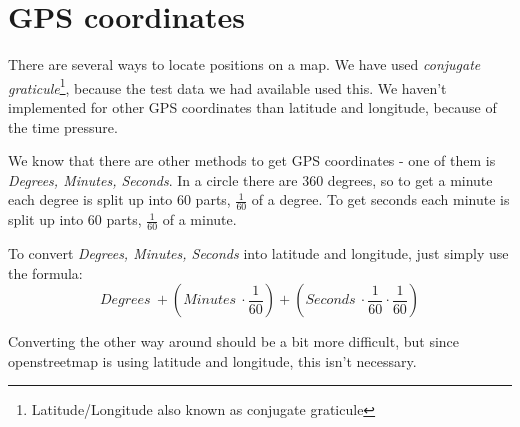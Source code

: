 \chapter{GPS coordinates}
There are several ways to locate positions on a map. We have used \emph{conjugate graticule}\footnote{Latitude/Longitude also known as conjugate graticule}, because the test data we had available used this. We haven't implemented for other GPS coordinates than latitude and longitude, because of the time pressure.

We know that there are other methods to get GPS coordinates - one of them is \emph{Degrees, Minutes, Seconds}. In a circle there are 360 degrees, so to get a minute each degree is split up into 60 parts, $\frac{1}{60}$ of a degree. To get seconds each minute is split up into 60 parts, $\frac{1}{60}$ of a minute.

To convert \emph{Degrees, Minutes, Seconds} into latitude and longitude, just simply use the formula:
$$Degrees~ + \left(Minutes~ \cdot \frac{1}{60}\right) + \left(Seconds~ \cdot \frac{1}{60} \cdot \frac{1}{60}\right)$$

Converting the other way around should be a bit more difficult, but since openstreetmap is using latitude and longitude, this isn't necessary.